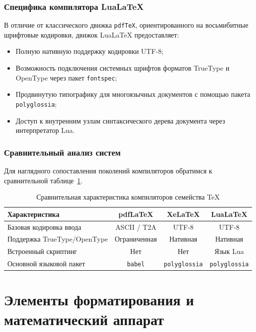 \documentclass[14pt]{extreport}
\begin{document}
\subsection{Специфика компилятора LuaLaTeX}
В отличие от классического движка \texttt{pdfTeX}, ориентированного на восьмибитные шрифтовые кодировки, движок LuaLaTeX предоставляет:
\begin{itemize}
    \item Полную нативную поддержку кодировки UTF-8;
    \item Возможность подключения системных шрифтов форматов TrueType и OpenType через пакет \texttt{fontspec};
    \item Продвинутую типографику для многоязычных документов с помощью пакета \texttt{polyglossia};
    \item Доступ к внутренним узлам синтаксического дерева документа через интерпретатор Lua.
\end{itemize}

\subsection{Сравнительный анализ систем}
Для наглядного сопоставления поколений компиляторов обратимся к сравнительной таблице~\ref{tab:comparison}.

\begin{table}[h!]
\centering
\begin{tabular}{|l|c|c|c|}
\hline
\textbf{Характеристика} & \textbf{pdfLaTeX} & \textbf{XeLaTeX} & \textbf{LuaLaTeX} \\
\hline
Базовая кодировка ввода & ASCII / T2A & UTF-8 & UTF-8 \\
\hline
Поддержка TrueType/OpenType & Ограниченная & Нативная & Нативная \\
\hline
Встроенный скриптинг & Нет & Нет & Язык Lua \\
\hline
Основной языковой пакет & \texttt{babel} & \texttt{polyglossia} & \texttt{polyglossia} \\
\hline
\end{tabular}
\caption{Сравнительная характеристика компиляторов семейства \TeX}
\label{tab:comparison}
\end{table}

\chapter{Элементы форматирования и математический аппарат}
\end{document}
